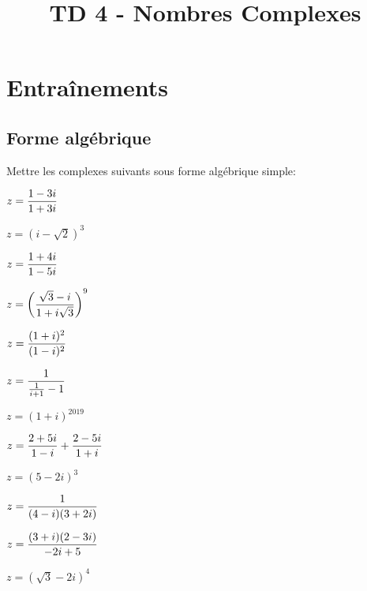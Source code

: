 \documentclass[a4paper, 11pt]{article}
\newcommand{\type}{TD }
\begin{document}
\title{\type  4 - Nombres Complexes}





\section*{Entraînements}
\subsection*{Forme algébrique}
\begin{exercice}  \;
Mettre les complexes suivants sous forme alg\'ebrique simple:
\begin{enumerate}
\begin{minipage}[t]{0.3\textwidth}
\item $z=\displaystyle\frac{1-3i}{1+3i}$ 
\item $z=(i-\sqrt{2})^3$
\item $z=\displaystyle\frac{1+4i}{1-5i}$ 
\item  $z=\left(\displaystyle\frac{\sqrt{3}-i}{1+i\sqrt{3}}  \right)^9$
\end{minipage}
\begin{minipage}[t]{0.3\textwidth}
\item $z=\displaystyle\frac{(1+i)^2}{(1-i)^2}$
\item $z=\displaystyle\frac{1}{\frac{1}{i+1}-1}$
\item $z=(1+i)^{2019}$
\item $z=\displaystyle\frac{2+5i}{1-i}+\displaystyle\frac{2-5i}{1+i}$
\end{minipage}
\begin{minipage}[t]{0.3\textwidth}
\item $z=(5-2i)^3$ 
\item $z=\displaystyle\frac{1}{(4-i)(3+2i)}$ 
\item $z=\displaystyle\frac{(3+i)(2-3i)}{-2i+5}$
\item $z=(\sqrt{3}-2i)^4$
\end{minipage}
\end{enumerate}
\end{exercice}
\end{document}
